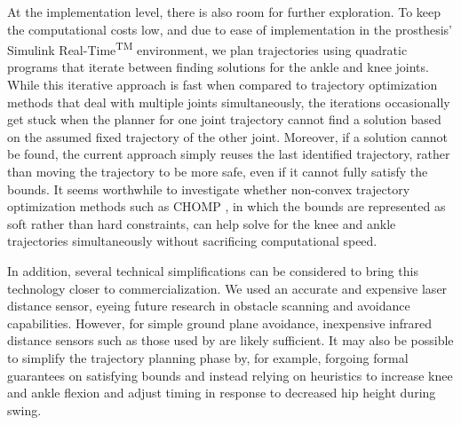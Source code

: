 At the implementation level, there is also room for further exploration. To keep
the  computational costs low, and due to ease of implementation in the
prosthesis' Simulink Real-Time\textsuperscript{TM} environment, we plan
trajectories using quadratic programs that iterate between finding solutions for
the ankle and knee joints.  While this iterative approach is fast when compared
to trajectory optimization methods that deal with multiple joints
simultaneously, the iterations occasionally get stuck when the planner for one
joint trajectory cannot find a solution based on the assumed fixed trajectory of
the other joint. Moreover, if a solution cannot be found, the current approach
simply reuses the last identified trajectory, rather than moving the trajectory
to be more safe, even if it cannot fully satisfy the bounds. It seems worthwhile
to investigate whether non-convex trajectory optimization methods such as CHOMP
\citep{ratliff2009chomp}, in which the bounds are represented as soft rather
than hard constraints, can help solve for the knee and ankle trajectories
simultaneously without sacrificing computational speed.

In addition, several technical simplifications can be considered to bring this
technology closer to commercialization. We used an accurate and expensive laser
distance sensor, eyeing future research in obstacle scanning and avoidance
capabilities. However, for simple ground plane avoidance, inexpensive infrared
distance sensors such as those used by \citet{scandaroli2009estimation} are
likely sufficient. It may also be possible to simplify the trajectory planning
phase by, for example, forgoing formal guarantees on satisfying bounds and
instead relying on heuristics to increase knee and ankle flexion and adjust
timing in response to decreased hip height during swing.
